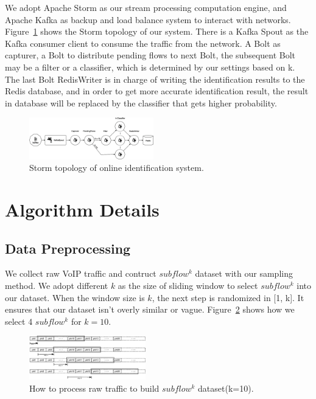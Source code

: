 \documentclass[conference]{IEEEtran}
\begin{document}
We adopt Apache Storm as our stream processing computation engine, and Apache Kafka as backup and load balance system to interact with networks. Figure~\ref{fig:storm} shows the Storm topology of our system. There is a Kafka Spout as the Kafka consumer client to consume the traffic from the network. A Bolt as capturer, a Bolt to distribute pending flows to next Bolt, the subsequent Bolt may be a filter or a classifier, which is determined by our settings based on k. The last Bolt RedisWriter is in charge of writing the identification results to the Redis database, and in order to get more accurate identification result, the result in database will be replaced by the classifier that gets higher probability.

\begin{figure}[htp]
\begin{center}
\includegraphics[width=0.48\textwidth]{storm.eps}
\caption{Storm topology of online identification system.}\label{fig:storm}
\end{center}
\end{figure}


\section{Algorithm Details}
\label{sec:algorithms}

\subsection{Data Preprocessing}
\label{sec:datapreprocessing}
We collect raw VoIP traffic and contruct $subflow^k$ dataset with our sampling method. We adopt different $k$ as the size of sliding window to select $subflow^k$ into our dataset. When the window size is $k$, the next step is randomized in [1, k]. It ensures that our dataset isn't overly similar or vague. Figure~\ref{fig:dataset} shows how we select 4 $subflow^k$ for $k=10$.
\begin{figure}[htp]
\begin{center}
\includegraphics[width=0.45\textwidth]{dataset.eps}
\caption{How to process raw traffic to build $subflow^k$ dataset(k=10).}\label{fig:dataset}
\end{center}
\end{figure}
\end{document}
